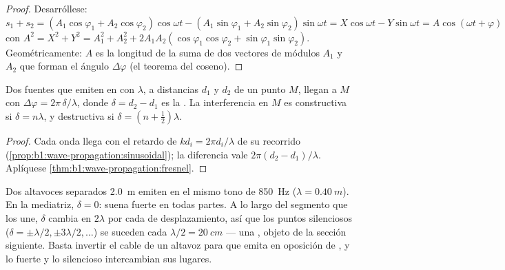 \begin{proof}
Desarróllese: $s_1 + s_2 = (A_1\cos\varphi_1 + A_2\cos\varphi_2)\cos\omega t -
(A_1\sin\varphi_1 + A_2\sin\varphi_2)\sin\omega t = X\cos\omega t -
Y\sin\omega t = A\cos(\omega t + \varphi)$ con $A^2 = X^2 + Y^2 =
A_1^2 + A_2^2 + 2A_1A_2(\cos\varphi_1\cos\varphi_2 + \sin\varphi_1\sin\varphi_2)$.
Geométricamente: $A$ es la longitud de la suma de dos vectores de módulos
$A_1$ y $A_2$ que forman el ángulo $\Delta\varphi$ (el teorema del coseno).
\end{proof}

\begin{proposition}\label{prop:b1:wave-propagation:pathdiff}
Dos fuentes que emiten en  con  $\lambda$, a
distancias $d_1$ y $d_2$ de un punto $M$, llegan a $M$ con
$\Delta\varphi = 2\pi\,\delta/\lambda$, donde $\delta = d_2 - d_1$ es la
\emph{}. La interferencia en $M$ es constructiva si
$\delta = n\lambda$, y destructiva si $\delta = (n + \tfrac12)\lambda$.
\end{proposition}

\begin{proof}
Cada onda llega con el retardo de  $kd_i = 2\pi d_i/\lambda$ de su
recorrido (\cref{prop:b1:wave-propagation:sinusoidal}); la diferencia vale
$2\pi(d_2 - d_1)/\lambda$. Aplíquese \cref{thm:b1:wave-propagation:fresnel}.
\end{proof}

\begin{example}\label{ex:b1:wave-propagation:speakers}
Dos altavoces separados \qty{2.0}{m} emiten en  el mismo tono de
\qty{850}{Hz} ($\lambda = \qty{0.40}{m}$). En la mediatriz, $\delta = 0$:
suena fuerte en todas partes. A lo largo del segmento que los une,
$\delta$ cambia en $2\lambda$ por cada  de
desplazamiento, así que los puntos silenciosos
($\delta = \pm\lambda/2, \pm 3\lambda/2, \dots$) se suceden cada
$\lambda/2 = \qty{20}{cm}$ --- una , objeto de la sección
siguiente. Basta invertir el cable de un altavoz para que emita en
oposición de , y lo fuerte y lo silencioso intercambian sus lugares.
\end{example}

